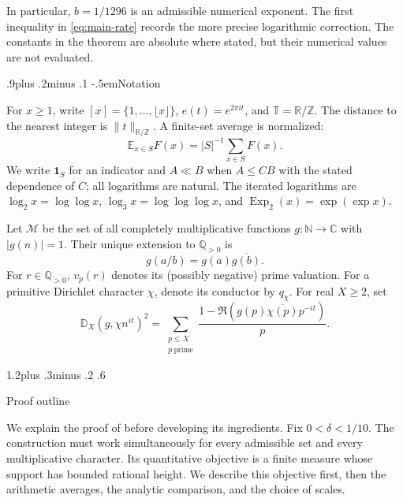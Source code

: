 \documentclass[twoside]{aomart}
\makeatletter
\theoremstyle{paperplain}
\theoremstyle{paperdefinition}
\renewcommand\section{\@startsection{section}{1}{\z@}
  {1.2\baselineskip plus .3\baselineskip minus .2\baselineskip}
  {.6\baselineskip}{\normalfont\large\bfseries\raggedright}}
\renewcommand\subsection{\@startsection{subsection}{2}{\z@}
  {.9\baselineskip plus .2\baselineskip minus .1\baselineskip}
  {-.5em}{\normalfont\bfseries}}
\newcommand{\E}{\mathbb E}
\newcommand{\Z}{\mathbb Z}
\newcommand{\N}{\mathbb N}
\newcommand{\Q}{\mathbb Q}
\newcommand{\R}{\mathbb R}
\newcommand{\C}{\mathbb C}
\newcommand{\T}{\mathbb T}
\newcommand{\Exp}{\operatorname{Exp}}
\numberwithin{equation}{section}
\makeatother
\begin{document}
In particular, $b=1/1296$ is an admissible numerical exponent.
The first inequality in \eqref{eq:main-rate} records the more precise
logarithmic correction. The constants in the theorem are absolute
where stated, but their numerical values are not evaluated.

\subsection{Notation}
\label{intro:notation}

For $x\ge1$, write $[x]=\{1,\ldots,\lfloor x\rfloor\}$,
$e(t)=e^{2\pi it}$, and $\T=\R/\Z$.  The distance to the nearest
integer is $\|t\|_{\R/\Z}$.  A finite-set average is normalized:
\begin{equation*}
 \E_{x\in S}F(x)=|S|^{-1}\sum_{x\in S}F(x).
\end{equation*}
We write $\mathbf1_S$ for an indicator and $A\ll B$ when
$A\le CB$ with the stated dependence of $C$; all logarithms are
natural.  The iterated logarithms are
$\log_2x=\log\log x$, $\log_3x=\log\log\log x$, and
$\Exp_2(x)=\exp(\exp x)$.

Let $\mathcal M$ be the set of all completely multiplicative functions
$g:\N\to\C$ with $|g(n)|=1$.  Their unique extension to
$\Q_{>0}$ is
\begin{equation}
 g(a/b)=g(a)\overline{g(b)}.
 \label{eq:rational-extension}
\end{equation}
For $r\in\Q_{>0}$, $v_p(r)$ denotes its (possibly negative) prime
valuation.  For a primitive Dirichlet character $\chi$,  denote its conductor
by $q_\chi$.  For real $X\ge2$, set
\begin{equation*}
 \mathbb D_X(g,\chi n^{it})^2
 =\sum_{\substack{p\le X\\p\ \mathrm{prime}}}\frac{1-\Re(g(p)\overline{\chi(p)}p^{-it})}{p}.
\end{equation*}

\section{Proof outline}
\label{sec:framework}

We explain the proof of  before developing its
ingredients. Fix $0<\delta<1/10$. The construction must work
simultaneously for every admissible set and every multiplicative
character. Its quantitative objective is a finite measure whose
support has bounded rational height. We describe this objective
first, then the arithmetic averages, the analytic comparison, and
the choice of scales. 
\end{document}
